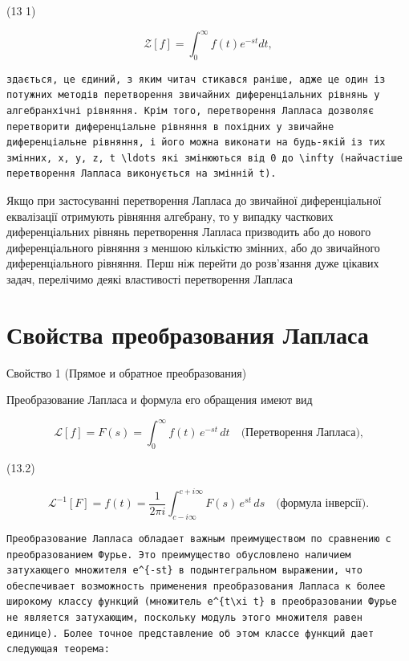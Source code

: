 \documentclass[
  ukrainian,
]{article}
\begin{document}
(13 1)

\[
\mathscr{Z}[f] = \int_{0}^{\infty} f(t) e^{-st} dt,
\]

\begin{verbatim}
здається, це єдиний, з яким читач стикався раніше, адже це один із потужних методів перетворення звичайних диференціальних рівнянь у алгебранхічні рівняння. Крім того, перетворення Лапласа дозволяє перетворити диференціальне рівняння в похідних у звичайне диференціальне рівняння, і його можна виконати на будь-якій із тих змінних, x, y, z, t \ldots які змінюються від 0 до \infty (найчастіше перетворення Лапласа виконується на змінній t).
\end{verbatim}

Якщо при застосуванні перетворення Лапласа до звичайної диференціальної
еквалізації отримують рівняння алгебрану, то у випадку часткових
диференціальних рівнянь перетворення Лапласа призводить або до нового
диференціального рівняння з меншою кількістю змінних, або до звичайного
диференціального рівняння. Перш ніж перейти до розв'язання дуже цікавих
задач, перелічимо деякі властивості перетворення Лапласа

\section{Свойства преобразования
Лапласа}\label{ux441ux432ux43eux439ux441ux442ux432ux430-ux43fux440ux435ux43eux431ux440ux430ux437ux43eux432ux430ux43dux438ux44f-ux43bux430ux43fux43bux430ux441ux430}

Свойство 1 (Прямое и обратное преобразования)

Преобразование Лапласа и формула его обращения имеют вид

\[
\mathscr{L}[f] = F(s) = \int_{0}^{\infty} f(t) \, e^{-st} \, dt \quad \text{(Перетворення Лапласа),}
\]

(13.2)

\[
\mathscr{L}^{-1}[F] = f(t) = \frac{1}{2\pi i} \int_{c-i\infty}^{c+i\infty} F(s) \, e^{st} \, ds \quad \text{(формула інверсії).}
\]

\begin{verbatim}
Преобразование Лапласа обладает важным преимуществом по сравнению с преобразованием Фурье. Это преимущество обусловлено наличием затухающего множителя e^{-st} в подынтегральном выражении, что обеспечивает возможность применения преобразования Лапласа к более широкому классу функций (множитель e^{t\xi t} в преобразовании Фурье не является затухающим, поскольку модуль этого множителя равен единице). Более точное представление об этом классе функций дает следующая теорема:
\end{verbatim}
\end{document}
